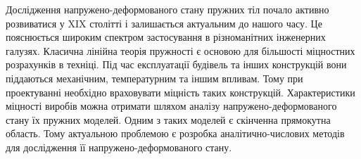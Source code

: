 
Дослідження напружено-деформованого стану пружних тіл почало активно розвиватися у XIX столітті і залишається актуальним до нашого часу.
Це пояснюється широким спектром застосування в різноманітних інженерних галузях.
Класична лінійна теорія пружності є основою для більшості міцностних розрахунків в техніці.
Під час експлуатації будівель та інших конструкцій вони піддаються механічним, температурним та іншим впливам.
Тому при проектуванні необхідно враховувати міцність таких конструкцій. Характеристики міцності виробів можна отримати шляхом аналізу напружено-деформованого стану їх пружних моделей.
Одним з таких моделей є скінченна прямокутна область.
Тому актуальною проблемою є розробка аналітично-числових методів для дослідження її напружено-деформованого стану.